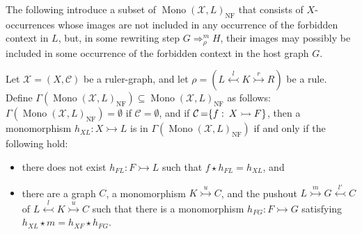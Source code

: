 The following introduce a subset of $\operatorname{Mono}(\mathcal{X},L)_{\operatorname{NF}}$ that consists of $X$-occurrences whose images are not included in any occurrence of the forbidden context in $L$,
    but, in some rewriting step $G \mathop{\Rightarrow}_\rho^m H$, their images may possibly be included in some occurrence of the forbidden context in the host graph $G$.
\begin{definition}
    \label{antipattern:def:gamma_l_rho_x}
    Let $\mathcal{X}=(X,\mathcal{C})$ be a ruler-graph, and let \( \rho \mathop{=} (L \overset{l}{\leftarrowtail} K \overset{r}{\rightarrowtail} R) \) be a rule.
    Define $\Gamma(\operatorname{Mono}(\mathcal{X},L)_{\operatorname{NF}})\subseteq \operatorname{Mono}(\mathcal{X},L)_{\operatorname{NF}}$ as follows:
    $\Gamma(\operatorname{Mono}(\mathcal{X},L)_{\operatorname{NF}}) \mathop{=} \emptyset$ if $\mathcal{C} \mathop{=} \emptyset$, and if $\mathcal{C} \mathop{=} \{f\mathop{\colon}X \rightarrowtail F\}$, then a monomorphism $h_{XL} \mathop{\colon} X \rightarrowtail L$ is in $\Gamma(\operatorname{Mono}(\mathcal{X},L)_{\operatorname{NF}})$ if and only if the following hold:
    \begin{itemize}
        \item there does not exist $h_{FL}:F \rightarrowtail L$ such that $f \mathop{\star} h_{FL} \mathop{=} h_{XL}$, and
         \item  
         there are a graph $C$, a monomorphism $K \overset{u}{\rightarrowtail} C$, and the pushout $L \overset{m}{\rightarrowtail} G \overset{l'}{\leftarrowtail} C$ of $L \overset{l}{\leftarrowtail} K \overset{u}{\rightarrowtail} C$ such that
         there is a monomorphism $h_{FG} \mathop{\colon} F \rightarrowtail G$ satisfying
         $h_{XL} \mathop{\star} m \mathop{=} h_{XF} \mathop{\star} h_{FG}$. 
      \begin{center}
        \end{center}
    \end{itemize}
\end{definition}
